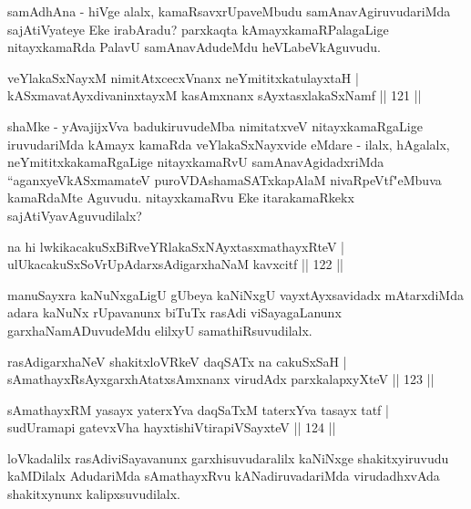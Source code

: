 \begin{artha}
samAdhAna - hiVge alalx, kamaRsavxrUpaveMbudu samAnavAgiruvudariMda sajAtiVyateye Eke irabAradu? parxkaqta kAmayxkamaRPalagaLige nitayxkamaRda PalavU samAnavAdudeMdu heVLabeVkAguvudu.
\end{artha}

\begin{shl}
veYlakaSxNayxM nimitAtxcecxVnanx neYmititxkatulayxtaH |\\
kASxmavatAyxdivaninxtayxM kasAmxnanx sAyxtasxlakaSxNamf \hfill || 121 ||
\end{shl}

\begin{artha}
shaMke - yAvajijxVva badukiruvudeMba nimitatxveV nitayxkamaRgaLige iruvudariMda kAmayx kamaRda veYlakaSxNayxvide eMdare - ilalx, hAgalalx, neYmititxkakamaRgaLige nitayxkamaRvU samAnavAgidadxriMda ``aganxyeVkASxmamateV puroVDAshamaSATxkapAlaM nivaRpeVtf"\break eMbuva kamaRdaMte Aguvudu. nitayxkamaRvu Eke itarakamaRkekx sajAtiVyavAguvudilalx?
\end{artha}

\begin{shl}
na hi lwkikacakuSxBiRveYRlakaSxNAyxtasxmathayxRteV |\\
ulUkacakuSxSoV\s rUpAdarxsAdigarxhaNaM kavxcitf \hfill || 122 ||
\end{shl}

\begin{artha}
manuSayxra kaNuNxgaLigU gUbeya kaNiNxgU vayxtAyxsavidadx mAtarxdiMda adara kaNuNx rUpavanunx biTuTx rasAdi viSayagaLanunx garxhaNamADuvudeMdu elilxyU samathiRsuvudilalx.
\end{artha}


\begin{shl}
rasAdigarxhaNeV shakitxloVRkeV daqSATx na cakuSxSaH |\\
sAmathayxRsAyxgarxhAtatxsAmxnanx virudAdx parxkalapxyXteV \hfill || 123 ||
\end{shl}

\begin{shl}
sAmathayxRM yasayx yaterxYva daqSaTxM taterxYva tasayx tatf |\\
sudUramapi gatevxVha hayxtishiVtirapiVSayxteV \hfill || 124 ||
\end{shl}

\begin{artha}
loVkadalilx rasAdiviSayavanunx garxhisuvudaralilx kaNiNxge shakitxyiru\-vudu kaMDilalx AdudariMda sAmathayxRvu kANadiruvadariMda virudadhxvAda shakitxynunx kalipxsuvudilalx.
\end{artha}

